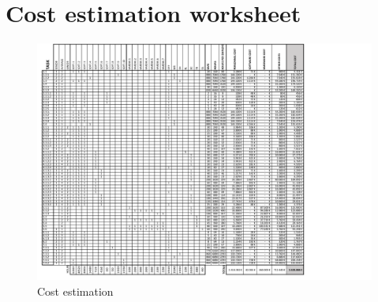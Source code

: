 

\section{Cost estimation worksheet}

	\begin{figure}[H]
	\centering
		\includegraphics[page=1,width=1.3\textwidth]{./Task8/Coststask8_v2.pdf}
	\caption{Cost estimation}
	\end{figure}

